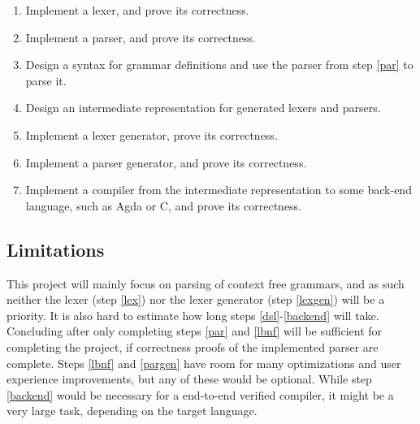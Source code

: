 \documentclass{article}
\begin{document}
	\begin{enumerate}

		\item \label{lex}
			
			Implement a lexer, and prove its correctness.

		\item \label{par}
			
			Implement a parser, and prove its correctness.

		\item \label{lbnf}

			Design a syntax for grammar definitions and use the parser from
			step \ref{par} to parse it.
		
		\item \label{dsl}
			
			Design an intermediate representation for generated lexers and
			parsers. 

		\item \label{lexgen}
			
			Implement a lexer generator, prove its correctness.

		\item \label{pargen}
			
			Implement a parser generator, and prove  its correctness.
		
		\item \label{backend}

			Implement a compiler from the intermediate representation to some
			back-end language, such as Agda or C, and prove its correctness.

	\end{enumerate}

	\subsection{Limitations}
		

		This project will mainly focus on parsing of context free grammars, and
		as such neither the lexer (step \ref{lex}) nor the lexer generator
		(step \ref{lexgen}) will be a priority. It is also hard to estimate how
		long steps \ref{dsl}-\ref{backend} will take. Concluding after only
		completing steps \ref{par} and \ref{lbnf} will be sufficient for
		completing the project, if correctness proofs of the implemented parser
		are complete.  Steps \ref{lbnf} and \ref{pargen} have room for many
		optimizations and user experience improvements, but any of these would
		be optional. While step \ref{backend} would be necessary for a
		end-to-end verified compiler, it might be a very large task, depending
		on the target language. 
		
\end{document}
